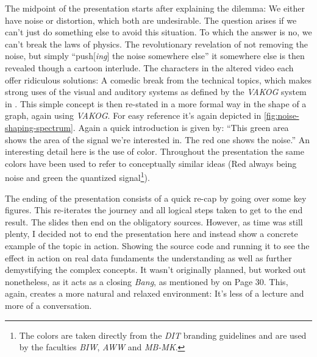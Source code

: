 The midpoint of the presentation starts after explaining the dilemma: We either have noise or distortion, which both are undesirable.
The question arises if we can't just do something else to avoid this situation.
To which the answer is no, we can't break the laws of physics.
The revolutionary revelation of not removing the noise, but simply \enquote{push{[\textit{ing}]} the noise somewhere else} it somewhere else is then revealed though a cartoon interlude.
The characters in the altered video each offer ridiculous solutions: A comedic break from the technical topics, which makes strong uses of the visual and auditory systems as defined by the \textit{VAKOG} system in \autocite[Page 77]{williams2008presentations}.
This simple concept is then re-stated in a more formal way in the shape of a graph, again using \textit{VAKOG}.
For easy reference it's again depicted in \autoref{fig:noise-shaping-spectrum}.
Again a quick introduction is given by:
\enquote{This green area shows the area of the signal we're interested in. The red one shows the noise.}
An interesting detail here is the use of color.
Throughout the presentation the same colors have been used to refer to conceptually similar ideas (Red always being noise and green the quantized signal\footnote{The colors are taken directly from the \textit{DIT} branding guidelines and are used by the faculties \textcolor{THDGreen}{\textit{BIW}}, \textcolor{THDDarkRed}{\textit{AWW}} and \textcolor{THDStrongBlue}{\textit{MB-MK}}.}).

The ending of the presentation consists of a quick re-cap by going over some key figures.
This re-iterates the journey and all logical steps taken to get to the end result.
The slides then end on the obligatory sources.
However, as time was still plenty, I decided not to end the presentation here and instead show a concrete example of the topic in action.
Showing the source code and running it to see the effect in action on real data fundaments the understanding as well as further demystifying the complex concepts.
It wasn't originally planned, but worked out nonetheless, as it acts as a closing \textit{Bang}, as mentioned by \citeauthor{williams2008presentations} on Page 30.
This, again, creates a more natural and relaxed environment:
It's less of a lecture and more of a conversation.
